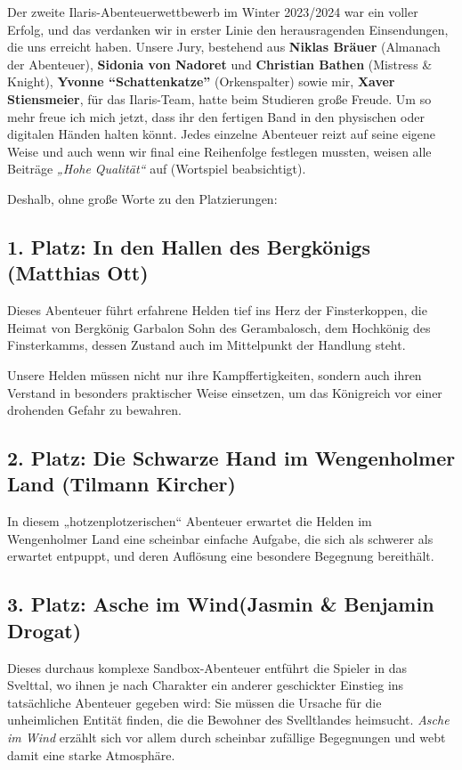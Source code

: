 Der zweite Ilaris-Abenteuerwettbewerb im Winter 2023/2024 war ein voller Erfolg, und das verdanken wir in erster Linie den herausragenden Einsendungen, die uns erreicht haben.
Unsere Jury, bestehend aus \textbf{Niklas Bräuer} (Almanach der Abenteuer), \textbf{Sidonia von Nadoret} und \textbf{Christian Bathen} (Mistress \& Knight), \textbf{Yvonne \enquote{Schattenkatze}} (Orkenspalter) sowie mir, \textbf{Xaver Stiensmeier}, für das Ilaris-Team, hatte beim Studieren große Freude.
Um so mehr freue ich mich jetzt, dass ihr den fertigen Band in den physischen oder digitalen Händen halten könnt. Jedes einzelne Abenteuer reizt auf seine eigene Weise und auch wenn wir final eine Reihenfolge festlegen mussten, weisen alle Beiträge \textit{„Hohe Qualität“} auf (Wortspiel beabsichtigt).

Deshalb, ohne große Worte zu den Platzierungen:

\subsection*{1. Platz: In den Hallen des Bergkönigs (Matthias Ott)}
Dieses Abenteuer führt erfahrene Helden tief ins Herz der Finsterkoppen, die Heimat von Bergkönig Garbalon Sohn des Gerambalosch, dem Hochkönig des Finsterkamms, dessen Zustand auch im Mittelpunkt der Handlung steht.

Unsere Helden müssen nicht nur ihre Kampffertigkeiten, sondern auch ihren Verstand in besonders praktischer Weise einsetzen, um das Königreich vor einer drohenden Gefahr zu bewahren.
\subsection*{2. Platz: Die Schwarze Hand im Wen\-gen\-holmer Land (Tilmann Kircher)}
In diesem „hotzenplotzerischen“ Abenteuer erwartet die Helden im Wengenholmer Land eine scheinbar einfache Aufgabe, die sich als schwerer als erwartet entpuppt, und deren Auflösung eine besondere Begegnung bereithält.
\subsection*{3. Platz: Asche im Wind\newline (Jasmin \& Benjamin Drogat)}
Dieses durchaus komplexe Sandbox-Abenteuer entführt die Spieler in das Svelttal, wo ihnen je nach Charakter ein anderer geschickter Einstieg ins tatsächliche Abenteuer gegeben wird: Sie müssen die Ursache für die unheimlichen Entität finden, die die Bewohner des Svelltlandes heimsucht. \textit{Asche im Wind} erzählt sich vor allem durch scheinbar zufällige Begegnungen und webt damit eine starke Atmosphäre. 

